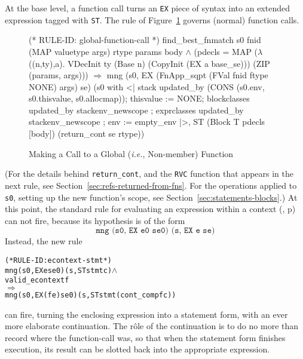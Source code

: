 \documentclass[11pt]{article}
\newcommand{\ie}{\emph{i.e.}}
\begin{document}
 At the base level, a function call turns
an \texttt{EX} piece of syntax into an extended expression tagged with
\texttt{ST}.  The rule  of
Figure~\ref{fig:global-function-call} governs (normal) function calls.
\begin{figure}[hbtp]
\begin{stdrule}
(* RULE-ID: global-function-call *)
     find_best_fnmatch s0 fnid (MAP valuetype args)
                       rtype params body \(\land\)
     (pdecls = MAP (\(\lambda\)((n,ty),a).
                       VDecInit ty (Base n)
                                   (CopyInit (EX a base_se)))
                   (ZIP (params, args)))
   \(\Rightarrow\)
     mng (s0, EX (FnApp_sqpt (FVal fnid ftype NONE) args) se)
         (s0 with <| stack updated_by
                       (CONS (s0.env, s0.thisvalue,
                              s0.allocmap));
                     thisvalue := NONE;
                     blockclasses updated_by stackenv_newscope ;
                     exprclasses updated_by stackenv_newscope ;
                     env := empty_env |>,
          ST (Block T pdecls [body]) (return_cont se rtype))
\end{stdrule}
%
\caption{Making a Call to a Global (\ie, Non-member) Function}
\label{fig:global-function-call}
\end{figure}
%
%
(For the details behind \texttt{return_cont}, and the \texttt{RVC}
function that appears in the next rule, see
Section~\ref{sec:refs-returned-from-fns}.  For the operations applied
to \texttt{s0}, setting up the new function's scope, see
Section~\ref{sec:statements-blocks}.)  At this point, the standard
rule for evaluating an expression within a context
(, p\pageref{rule:econtext-expr}) can not fire,
because its hypothesis is of the form
\[
\texttt{mng (s0, EX e0 se0) (s, EX e se)}
\]
Instead, the new rule
\label{rule:econtext-stmt}
\begin{alltt}
(* RULE-ID: econtext-stmt *)
     mng (s0, EX e se0) (s, ST stmt c) \(\land\)
     valid_econtext f
   \(\Rightarrow\)
     mng (s0, EX (f e) se0) (s, ST stmt (cont_comp f c))
\end{alltt}
can fire, turning the enclosing expression into a statement form, with
an ever more elaborate continuation.   The r\^ole of the continuation
is to do no more than record where the function-call was, so that when
the statement form finishes execution, its result can be slotted back
into the appropriate expression.
\end{document}
